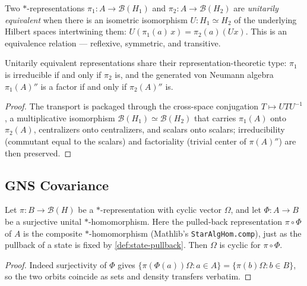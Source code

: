 \begin{definition}
    \label{def:unitary-equivalence}
    \leanok
    Two $*$-representations $\pi_1 : A \to \mathcal{B}(H_1)$ and $\pi_2 : A \to \mathcal{B}(H_2)$ are \emph{unitarily equivalent} when there is an isometric isomorphism $U : H_1 \simeq H_2$ of the underlying Hilbert spaces intertwining them: $U(\pi_1(a)\,x) = \pi_2(a)(U x)$. This is an equivalence relation --- reflexive, symmetric, and transitive.
\end{definition}

\begin{theorem}
    \label{thrm:unitary-equiv-invariants}
    \leanok
    Unitarily equivalent representations share their representation-theoretic type: $\pi_1$ is irreducible if and only if $\pi_2$ is, and the generated von Neumann algebra $\pi_1(A)''$ is a factor if and only if $\pi_2(A)''$ is.
\end{theorem}
\begin{proof}
    \leanok
    The transport is packaged through the cross-space conjugation $T \mapsto U T U^{-1}$, a multiplicative isomorphism $\mathcal{B}(H_1) \simeq \mathcal{B}(H_2)$ that carries $\pi_1(A)$ onto $\pi_2(A)$, centralizers onto centralizers, and scalars onto scalars; irreducibility (commutant equal to the scalars) and factoriality (trivial center of $\pi(A)''$) are then preserved.
\end{proof}

\subsection{GNS Covariance}

\begin{lemma}
    \label{lmm:cyclic-pullback-surjective}
    \leanok
    Let $\pi : B \to \mathcal{B}(H)$ be a $*$-representation with cyclic vector $\Omega$, and let $\Phi : A \to B$ be a surjective unital $*$-homomorphism. Here the pulled-back representation $\pi \circ \Phi$ of $A$ is the composite $*$-homomorphism (Mathlib's \texttt{StarAlgHom.comp}), just as the pullback of a state is fixed by \ref{def:state-pullback}. Then $\Omega$ is cyclic for $\pi \circ \Phi$.
\end{lemma}
\begin{proof}
    \leanok
    Indeed surjectivity of $\Phi$ gives $\{\pi(\Phi(a))\Omega : a \in A\} = \{\pi(b)\Omega : b \in B\}$, so the two orbits coincide as sets and density transfers verbatim.
\end{proof}

